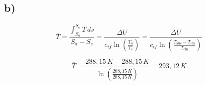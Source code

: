 

\subsection*{b)}

\[
\overline{T} = \frac{\int_{S_a}^{S_e} T \, ds}{S_a - S_e} = \frac{\Delta U}{c_{if} \ln \left( \frac{T_a}{T_e} \right)} = \frac{\Delta U}{c_{if} \ln \left( \frac{T_{\text{aus}} - T_{\text{ein}}}{T_{\text{ein}}} \right)}
\]

\[
\overline{T} = \frac{288,15\,K - 288,15\,K}{\ln \left( \frac{288,15\,K}{288,15\,K} \right)} = 293,12\,K
\]